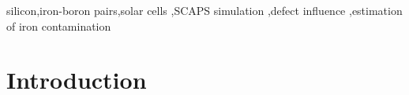 \documentclass[a4paper,fleqn]{cas-sc}
\begin{document}
\begin{keywords}
 silicon\sep iron-boron pairs\sep solar cells \sep SCAPS simulation \sep defect influence \sep estimation of iron contamination
\end{keywords}

\maketitle

\section{Introduction}%
\par
%
%
%
%
\end{document}
